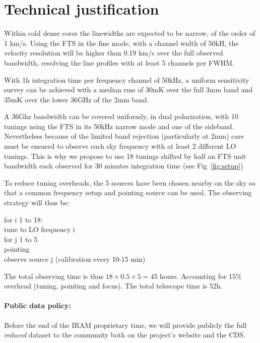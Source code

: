 \section{Technical justification}
 Within cold dense cores the linewidths are expected to be narrow, of the order of 1 km/s. Using the FTS in the fine mode, with a channel width of 50kH, the velocity resolution will be higher than 0.19 km/s over the full observed bandwidth, resolving the line profiles with at least 5 channels per FWHM.

With 1h integration time per frequency channel of 50kHz, a uniform sensitivity survey can be achieved with a median rms of 30mK over the full 3mm band and 35mK over the lower 36GHz of the 2mm band. 

A 36Ghz bandwidth can be covered uniformly, in dual polarization, with 10 tunings using the FTS in its 50kHz narrow mode and one of the sideband. Nevertheless because of the limited band rejection (particularly at 2mm) care must be ensured to observe each sky frequency with at least 2 different LO tunings. This is why we propose to use 18 tunings shifted by half an FTS unit bandwidth each observed for 30 minutes integration time (see Fig~\ref{fig:setup})

To reduce tuning overheads, the 5 sources have been chosen nearby on the sky so that a common frequency setup and pointing source can be used. The observing strategy will thus be: 
\begin{program}
\end{program}
\noindent for i 1 to 18:\\
\indent  tune to LO frequency i\\
\indent  for j 1 to 5\\
\indent pointing\\
\indent observe source j (calibration every 10-15 min)

The total observing time is thus $18\times0.5\times5=45$ hours. Accounting for 15\% overhead (tuning, pointing and focus). The total telescope time is 52h.
   
\paragraph{Public data policy:} Before the end of the IRAM proprietary time, we will provide publicly the full \emph{reduced} dataset to the community both on the project's website and the CDS.
  
  
  
  
  